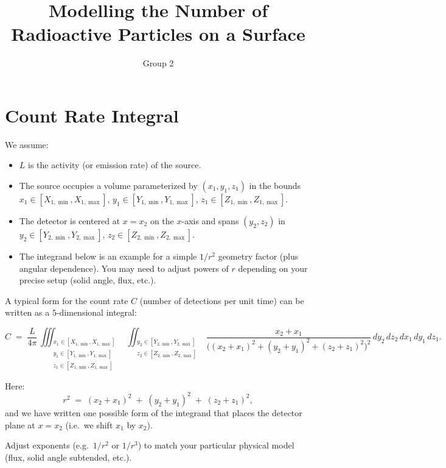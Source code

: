 \documentclass[11pt]{article}
\title{\textbf{Modelling the Number of Radioactive Particles on a Surface}}
\author{Group 2}
\begin{document}
\maketitle

\section*{Count Rate Integral}

We assume:
\begin{itemize}
  \item $L$ is the activity (or emission rate) of the source.
  \item The source occupies a volume parameterized by $(x_1, y_1, z_1)$ 
        in the bounds $x_1 \in [X_{1,\min}, X_{1,\max}]$, 
        $y_1 \in [Y_{1,\min}, Y_{1,\max}]$, 
        $z_1 \in [Z_{1,\min}, Z_{1,\max}]$.
  \item The detector is centered at $x = x_2$ on the $x$-axis and spans 
        $(y_2,z_2)$ in $y_2 \in [Y_{2,\min}, Y_{2,\max}]$, 
        $z_2 \in [Z_{2,\min}, Z_{2,\max}]$.
  \item The integrand below is an example for a simple $1/r^2$ geometry factor 
        (plus angular dependence).  You may need to adjust powers of $r$ 
        depending on your precise setup (solid angle, flux, etc.).
\end{itemize}

A typical form for the count rate $C$ (number of detections per unit time) can be written as a $5$-dimensional integral:

\[
C \;=\; \frac{L}{4 \pi}
\,\iiint_{\substack{x_1 \in [X_{1,\min}, X_{1,\max}]\\
                   y_1 \in [Y_{1,\min}, Y_{1,\max}]\\
                   z_1 \in [Z_{1,\min}, Z_{1,\max}]}}
\,\iint_{\substack{y_2 \in [Y_{2,\min}, Y_{2,\max}]\\
                   z_2 \in [Z_{2,\min}, Z_{2,\max}]}}
\frac{x_2 + x_1}{\bigl((x_2 + x_1)^2 + (y_2 + y_1)^2 + (z_2 + z_1)^2 \bigr)^{2}}
\,dy_2\,dz_2\,dx_1\,dy_1\,dz_1.
\]

Here:
\[
r^2 \;=\; (x_2 + x_1)^2 \;+\; (y_2 + y_1)^2 \;+\; (z_2 + z_1)^2,
\]
and we have written one possible form of the integrand that places the detector plane at $x = x_2$ (i.e.\ we shift $x_1$ by $x_2$).  

Adjust exponents (e.g.\ $1/r^2$ or $1/r^3$) to match your particular physical model (flux, solid angle subtended, etc.).
\end{document}
